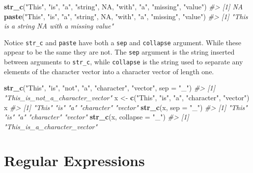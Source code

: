\documentclass[]{book}
\newenvironment{Shaded}{\begin{snugshade}}{\end{snugshade}}
\newcommand{\CommentTok}[1]{\textcolor[rgb]{0.56,0.35,0.01}{\textit{#1}}}
\newcommand{\DataTypeTok}[1]{\textcolor[rgb]{0.13,0.29,0.53}{#1}}
\newcommand{\KeywordTok}[1]{\textcolor[rgb]{0.13,0.29,0.53}{\textbf{#1}}}
\newcommand{\NormalTok}[1]{#1}
\newcommand{\OtherTok}[1]{\textcolor[rgb]{0.56,0.35,0.01}{#1}}
\newcommand{\StringTok}[1]{\textcolor[rgb]{0.31,0.60,0.02}{#1}}
\theoremstyle{definition}
\theoremstyle{definition}
\theoremstyle{definition}
\theoremstyle{remark}
\begin{document}
\begin{Shaded}
\begin{Highlighting}[]
\KeywordTok{str_c}\NormalTok{(}\StringTok{"This"}\NormalTok{, }\StringTok{"is"}\NormalTok{, }\StringTok{"a"}\NormalTok{, }\StringTok{"string"}\NormalTok{, }\OtherTok{NA}\NormalTok{, }\StringTok{"with"}\NormalTok{, }\StringTok{"a"}\NormalTok{, }\StringTok{"missing"}\NormalTok{, }\StringTok{"value"}\NormalTok{)}
\CommentTok{#> [1] NA}
\KeywordTok{paste}\NormalTok{(}\StringTok{"This"}\NormalTok{, }\StringTok{"is"}\NormalTok{, }\StringTok{"a"}\NormalTok{, }\StringTok{"string"}\NormalTok{, }\OtherTok{NA}\NormalTok{, }\StringTok{"with"}\NormalTok{, }\StringTok{"a"}\NormalTok{, }\StringTok{"missing"}\NormalTok{, }\StringTok{"value"}\NormalTok{)}
\CommentTok{#> [1] "This is a string NA with a missing value"}
\end{Highlighting}
\end{Shaded}

Notice \texttt{str\_c} and \texttt{paste} have both a \texttt{sep} and
\texttt{collapse} argument. While these appear to be the same they are
not. The \texttt{sep} argument is the string inserted between arguments
to \texttt{str\_c}, while \texttt{collapse} is the string used to
separate any elements of the character vector into a character vector of
length one.

\begin{Shaded}
\begin{Highlighting}[]
\KeywordTok{str_c}\NormalTok{(}\StringTok{"This"}\NormalTok{, }\StringTok{"is"}\NormalTok{, }\StringTok{"not"}\NormalTok{, }\StringTok{"a"}\NormalTok{, }\StringTok{"character"}\NormalTok{, }\StringTok{"vector"}\NormalTok{, }\DataTypeTok{sep =} \StringTok{"_"}\NormalTok{)}
\CommentTok{#> [1] "This_is_not_a_character_vector"}
\NormalTok{x <-}\StringTok{ }\KeywordTok{c}\NormalTok{(}\StringTok{"This"}\NormalTok{, }\StringTok{"is"}\NormalTok{, }\StringTok{"a"}\NormalTok{, }\StringTok{"character"}\NormalTok{, }\StringTok{"vector"}\NormalTok{)}
\NormalTok{x}
\CommentTok{#> [1] "This"      "is"        "a"         "character" "vector"}
\KeywordTok{str_c}\NormalTok{(x, }\DataTypeTok{sep =} \StringTok{"_"}\NormalTok{)}
\CommentTok{#> [1] "This"      "is"        "a"         "character" "vector"}
\KeywordTok{str_c}\NormalTok{(x, }\DataTypeTok{collapse =} \StringTok{"_"}\NormalTok{)}
\CommentTok{#> [1] "This_is_a_character_vector"}
\end{Highlighting}
\end{Shaded}

\hypertarget{regular-expressions}{%
\section{Regular Expressions}\label{regular-expressions}}
\end{document}
